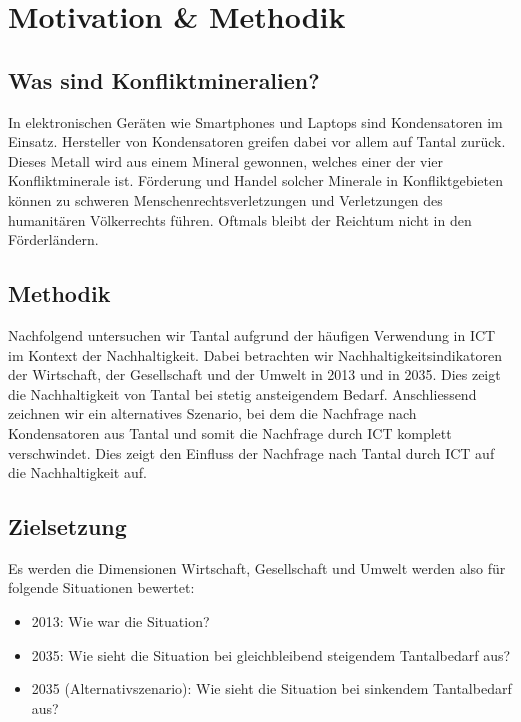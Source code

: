 \section{Motivation \& Methodik}\label{sec:motivation}

\subsection{Was sind Konfliktmineralien?}

In elektronischen Geräten wie Smartphones und Laptops sind Kondensatoren im Einsatz.
Hersteller von Kondensatoren greifen dabei vor allem auf Tantal zurück. Dieses Metall wird aus einem Mineral gewonnen, welches einer der vier Konfliktminerale ist.
Förderung und Handel solcher Minerale in Konfliktgebieten können zu schweren Menschenrechtsverletzungen und Verletzungen des humanitären Völkerrechts führen. Oftmals bleibt der Reichtum nicht in den Förderländern.
~\cite{definiti26:online}

\subsection{Methodik}

Nachfolgend untersuchen wir Tantal aufgrund der häufigen Verwendung in ICT im Kontext der Nachhaltigkeit. Dabei betrachten wir Nachhaltigkeitsindikatoren der Wirtschaft, der Gesellschaft und der Umwelt in 2013 und in 2035. Dies zeigt die Nachhaltigkeit von Tantal bei stetig ansteigendem Bedarf.
Anschliessend zeichnen wir ein alternatives Szenario, bei dem die Nachfrage nach Kondensatoren aus Tantal und somit die Nachfrage durch ICT komplett verschwindet. Dies zeigt den Einfluss der Nachfrage nach Tantal durch ICT auf die Nachhaltigkeit auf.

\subsection{Zielsetzung}

Es werden die Dimensionen Wirtschaft, Gesellschaft und Umwelt werden also für folgende Situationen bewertet:

\begin{itemize}
  \item 2013: Wie war die Situation?
  \item 2035: Wie sieht die Situation bei gleichbleibend steigendem Tantalbedarf aus?
  \item 2035 (Alternativszenario): Wie sieht die Situation bei sinkendem Tantalbedarf aus?
\end{itemize}
